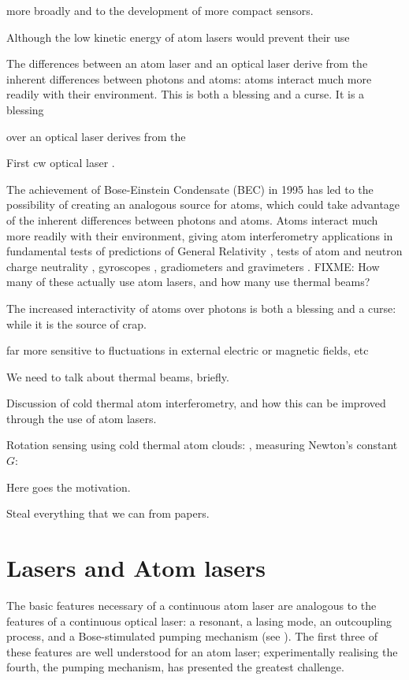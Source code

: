 more broadly and to the development of more compact sensors.  




Although the low kinetic energy of atom lasers would prevent their use 


The differences between an atom laser and an optical laser derive from the inherent differences between photons and atoms: atoms interact much more readily with their environment.  This is both a blessing and a curse.  It is a blessing

 over an optical laser derives from the 



First cw optical laser \citep{Javan:1961}.


The achievement of Bose-Einstein Condensate (BEC) in 1995 \citep{Anderson:1995vn,Bradley:1995ys,Davis:1995} has led to the possibility of creating an analogous source for atoms, which could take advantage of the inherent differences between photons and atoms.  Atoms interact much more readily with their environment, giving atom interferometry applications in fundamental tests of predictions of General Relativity \citep{Dimopoulos:2007uq}, tests of atom and neutron charge neutrality \citep{Arvanitaki:2007}, gyroscopes \citep{Gustavson:1997}, gradiometers \citep{Snadden:1998,McGuirk:2002} and gravimeters \citep{Peters:2001}.  FIXME: How many of these actually use atom lasers, and how many use thermal beams?

The increased interactivity of atoms over photons is both a blessing and a curse: while it is the source of crap.

far more sensitive to fluctuations in external electric or magnetic fields, etc


We need to talk about thermal beams, briefly.

Discussion of cold thermal atom interferometry, and how this can be improved through the use of atom lasers. 

Rotation sensing using cold thermal atom clouds: \citep{Canuel:2006}, measuring Newton's constant $G$: \citep{Lamporesi:2008}


Here goes the motivation.

Steal everything that we can from papers.

\section{Lasers and Atom lasers}

The basic features necessary of a continuous atom laser are analogous to the features of a continuous optical laser: a resonant, a lasing mode, an outcoupling process, and a Bose-stimulated pumping mechanism (see ).  The first three of these features are well understood for an atom laser; experimentally realising the fourth, the pumping mechanism, has presented the greatest challenge.

